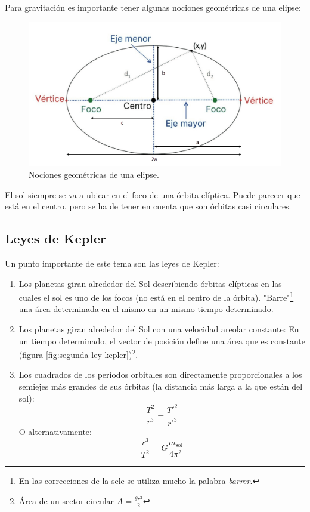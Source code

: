 \documentclass[arial,a4paper,print]{article}
\begin{document}
Para gravitación es importante tener algunas nociones geométricas de una elipse: 
\begin{figure}[H]
	\centering
	\includegraphics[width=0.4\linewidth]{figures/elipse_esquema}
	\caption{Nociones geométricas de una elipse. }
	\label{fig:elipseesquema}
\end{figure}
El sol siempre se va a ubicar en el foco de una órbita elíptica. Puede parecer que está en el centro, pero se ha de tener en cuenta que son órbitas casi circulares. 



\subsection{Leyes de Kepler}
Un punto importante de este tema son las leyes de Kepler:
\begin{enumerate}
	\item Los planetas giran alrededor del Sol describiendo órbitas elípticas en las cuales el sol es uno de los focos (no está en el centro de la órbita). "Barre"\footnote{En las correcciones de la sele se utiliza mucho la palabra \textit{barrer}. } una área determinada en el mismo en un mismo tiempo determinado. 
	\item Los planetas  giran alrededor del Sol con una velocidad areolar constante: En un tiempo determinado, el vector de posición define una área que es constante (figura \ref{fig:segunda-ley-kepler})\footnote{Área de un sector circular $A=\frac{\theta r^{2}}{2}$}.
	\item Los cuadrados de los períodos orbitales son directamente proporcionales a los semiejes más grandes de sus órbitas (la distancia más larga a la que están del sol): 
	\begin{equation*}
		\frac{T^2}{r^{3}} = \frac{{T'}^2}{{r'}^{3}}
	\end{equation*}
 	O alternativamente:
 	\begin{equation*}
 		\frac{r^{3}}{T^{2}} = G\frac{m_{\text{sol}}}{4\pi^{2}}
 	\end{equation*}
\end{enumerate}
\end{document}
